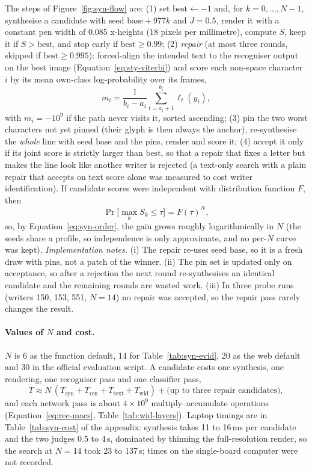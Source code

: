 The steps of Figure~\ref{fig:syn-flow} are:
(1) set $\mathrm{best}\leftarrow-1$ and, for $k=0,\ldots,N-1$, synthesise a candidate with seed $\mathrm{base}+977k$ and $J=0.5$, render it with a constant pen width of 0.085 x-heights (18 pixels per millimetre), compute $S$, keep it if $S>\mathrm{best}$, and stop early if $\mathrm{best}\ge0.99$;
(2) \emph{repair} (at most three rounds, skipped if $\mathrm{best}\ge0.995$): forced-align the intended text to the recogniser output on the best image (Equation~\ref{eq:sty-viterbi}) and score each non-space character $i$ by its mean own-class log-probability over its frames,
\begin{equation}
m_i=\frac{1}{b_i-a_i}\sum_{t=a_i+1}^{b_i}\ell_t(y_i),
\label{eq:syn-weak}
\end{equation}
with $m_i=-10^9$ if the path never visits it, sorted ascending;
(3) pin the two worst characters not yet pinned (their glyph is then always the anchor), re-synthesise the \emph{whole} line with seed $\mathrm{base}$ and the pins, render and score it;
(4) accept it only if its joint score is strictly larger than $\mathrm{best}$, so that a repair that fixes a letter but makes the line look like another writer is rejected (a text-only search with a plain repair that accepts on text score alone was measured to cost writer identification).
If candidate scores were independent with distribution function $F$, then
\begin{equation}
\Pr\bigl[\max_kS_k\le\tau\bigr]=F(\tau)^N,
\label{eq:syn-order}
\end{equation}
so, by Equation~\ref{eq:syn-order}, the gain grows roughly logarithmically in $N$ (the seeds share a profile, so independence is only approximate, and no per-$N$ curve was kept).
\emph{Implementation notes.} (i) The repair re-uses seed $\mathrm{base}$, so it is a fresh draw with pins, not a patch of the winner. (ii) The pin set is updated only on acceptance, so after a rejection the next round re-synthesises an identical candidate and the remaining rounds are wasted work. (iii) In three probe runs (writers 150, 153, 551, $N=14$) no repair was accepted, so the repair pass rarely changes the result.

\paragraph{Values of $N$ and cost.}
$N$ is 6 as the function default, 14 for Table~\ref{tab:syn-evid}, 20 as the web default and 30 in the official evaluation script.
A candidate costs one synthesis, one rendering, one recogniser pass and one classifier pass,
\begin{equation}
T\approx N\,(T_{\mathrm{syn}}+T_{\mathrm{ren}}+T_{\mathrm{text}}+T_{\mathrm{wid}})+\text{(up to three repair candidates)},
\label{eq:syn-cost}
\end{equation}
and each network pass is about $4\times10^9$ multiply--accumulate operations (Equation~\ref{eq:rec-macs}, Table~\ref{tab:wid-layers}).
Laptop timings are in Table~\ref{tab:syn-cost} of the appendix: synthesis takes 11 to 16\,ms per candidate and the two judges 0.5 to 4\,s, dominated by thinning the full-resolution render, so the search at $N=14$ took 23 to 137\,s; times on the single-board computer were not recorded.

